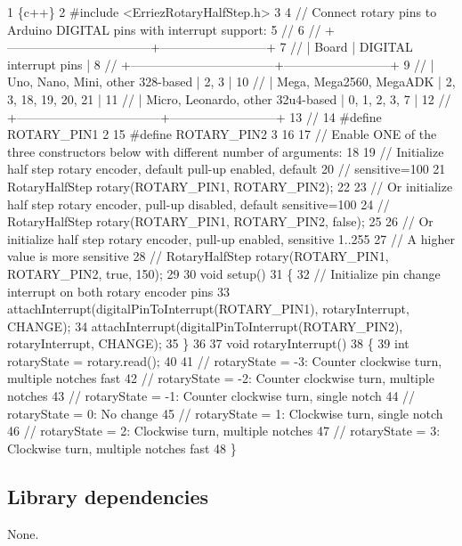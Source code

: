 \begin{DoxyCode}
1 \{c++\}
2 #include <ErriezRotaryHalfStep.h>
3 
4 // Connect rotary pins to Arduino DIGITAL pins with interrupt support:
5 //
6 // +-----------------------------------+--------------------------+
7 // |              Board                |  DIGITAL interrupt pins  |
8 // +-----------------------------------+--------------------------+
9 // | Uno, Nano, Mini, other 328-based  |  2, 3                    |
10 // | Mega, Mega2560, MegaADK           |  2, 3, 18, 19, 20, 21    |
11 // | Micro, Leonardo, other 32u4-based |  0, 1, 2, 3, 7           |
12 // +-----------------------------------+--------------------------+
13 //
14 #define ROTARY\_PIN1   2
15 #define ROTARY\_PIN2   3
16 
17 // Enable ONE of the three constructors below with different number of arguments:
18 
19 // Initialize half step rotary encoder, default pull-up enabled, default 
20 // sensitive=100
21 RotaryHalfStep rotary(ROTARY\_PIN1, ROTARY\_PIN2);
22 
23 // Or initialize half step rotary encoder, pull-up disabled, default sensitive=100
24 // RotaryHalfStep rotary(ROTARY\_PIN1, ROTARY\_PIN2, false);
25 
26 // Or initialize half step rotary encoder, pull-up enabled, sensitive 1..255
27 // A higher value is more sensitive
28 // RotaryHalfStep rotary(ROTARY\_PIN1, ROTARY\_PIN2, true, 150);
29 
30 void setup()
31 \{
32   // Initialize pin change interrupt on both rotary encoder pins
33   attachInterrupt(digitalPinToInterrupt(ROTARY\_PIN1), rotaryInterrupt, CHANGE);
34   attachInterrupt(digitalPinToInterrupt(ROTARY\_PIN2), rotaryInterrupt, CHANGE);
35 \}
36 
37 void rotaryInterrupt()
38 \{
39   int rotaryState = rotary.read();
40 
41   // rotaryState = -3: Counter clockwise turn, multiple notches fast
42   // rotaryState = -2: Counter clockwise turn, multiple notches
43   // rotaryState = -1: Counter clockwise turn, single notch
44   // rotaryState = 0:  No change
45   // rotaryState = 1:  Clockwise turn, single notch
46   // rotaryState = 2:  Clockwise turn, multiple notches
47   // rotaryState = 3:  Clockwise turn, multiple notches fast
48 \}
\end{DoxyCode}


\subsection*{Library dependencies}


\begin{DoxyItemize}
\item None.
\end{DoxyItemize}

